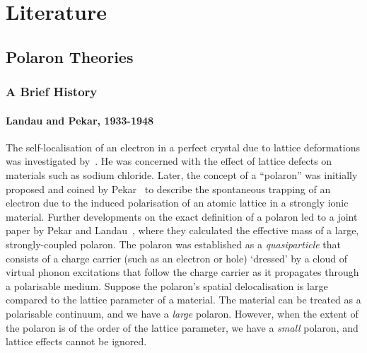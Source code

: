\chapter{Literature}
\label{chap:second}



\section{Polaron Theories}
\label{sec:2-1}

\subsection{A Brief History}
\label{subsec:2-1-1}

\subsubsection{Landau and Pekar, 1933-1948}
\label{subsubsec:2-1-1-1}

The self-localisation of an electron in a perfect crystal due to lattice deformations was investigated by~\cite{landau_motion_1933}. He was concerned with the effect of lattice defects on materials such as sodium chloride. Later, the concept of a ``polaron'' was initially proposed and coined by Pekar~\cite{pekar_local_1946, pekar_notitle_1946, pekar_notitle_1947} to describe the spontaneous trapping of an electron due to the induced polarisation of an atomic lattice in a strongly ionic material. Further developments on the exact definition of a polaron led to a joint paper by Pekar and Landau~\cite{pekar_effective_1948}, where they calculated the effective mass of a large,  strongly-coupled polaron. The polaron was established as a \emph{quasiparticle} that consists of a charge carrier (such as an electron or hole) `dressed' by a cloud of virtual phonon excitations that follow the charge carrier as it propagates through a polarisable medium. Suppose the polaron's spatial delocalisation is large compared to the lattice parameter of a material. The material can be treated as a polarisable continuum, and we have a \emph{large} polaron. However, when the extent of the polaron is of the order of the lattice parameter, we have a \emph{small} polaron, and lattice effects cannot be ignored.

